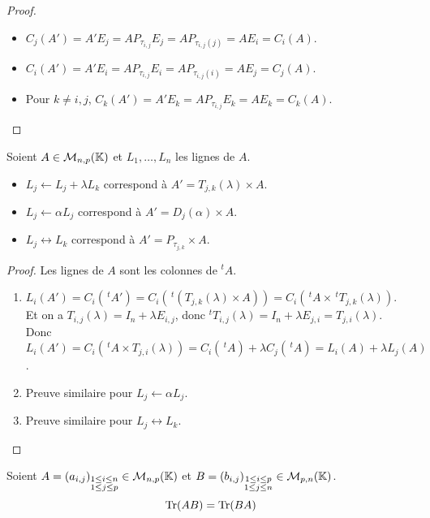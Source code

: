 \documentclass[12pt,a4paper]{report}
\begin{document}
\begin{proof}
    \begin{itemize}
        \item $C_j(A') = A' E_j = A P_{\tau_{i,j}} E_j = A P_{\tau_{i,j}(j)} = A E_i = C_i(A)$.
        \item $C_i(A') = A' E_i = A P_{\tau_{i,j}} E_i = A P_{\tau_{i,j}(i)} = A E_j = C_j(A)$.
        \item Pour $k \ne i,j$, $C_k(A') = A' E_k = A P_{\tau_{i,j}} E_k = A E_k = C_k(A)$.
    \end{itemize}
\end{proof}

\begin{property}
    Soient $A \in \mathcal M_{n,p}(\mathbb{K})$ et $L_1, \dots, L_n$ les lignes de $A$.
    
    \begin{itemize}
        \item $L_j \leftarrow L_j + \lambda L_k$ correspond à $A' = T_{j,k}(\lambda) \times A$.

        \item $L_j \leftarrow \alpha L_j$ correspond à $A' = D_j(\alpha) \times A$.

        \item $L_j \leftrightarrow L_k$ correspond à $A' = P_{\tau_{j,k}} \times A$.
    \end{itemize}
\end{property}

\begin{proof}
    Les lignes de $A$ sont les colonnes de $^tA$.

    \begin{enumerate}
        \item $L_i(A') = C_i(\,^tA') = C_i(\,^t(T_{j,k}(\lambda) \times A)) = C_i(\,^tA \times \,^tT_{j,k}(\lambda))$.\\Et on a $T_{i,j}(\lambda) = I_n + \lambda E_{i,j}$, donc $^tT_{i,j}(\lambda) = I_n + \lambda E_{j,i} = T_{j,i}(\lambda)$.\\Donc $L_i(A') = C_i(\,^tA \times T_{j,i}(\lambda)) = C_i(\,^tA) + \lambda C_j(\,^tA) = L_i(A) + \lambda L_j(A)$.
        \item Preuve similaire pour $L_j \leftarrow \alpha L_j$.
        \item Preuve similaire pour $L_j \leftrightarrow L_k$.
    \end{enumerate}
\end{proof}

\begin{property}
    Soient $A = (a_{i,j})_{\substack{1 \le i \le n \\ 1 \le j \le p}} \in \mathcal M_{n,p}(\mathbb{K})$ et $B = (b_{i,j})_{\substack{1 \le i \le p \\ 1 \le j \le n}} \in \mathcal M_{p,n}(\mathbb{K})$.
    $$\mathrm{Tr}(AB) = \mathrm{Tr}(BA)$$
\end{property}
\end{document}
